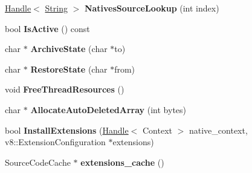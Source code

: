 \begin{DoxyCompactItemize}
\item 
\hypertarget{classv8_1_1internal_1_1_v8___f_i_n_a_l_a0fd236172f555c012da404f3e9b9d08c}{}\hyperlink{classv8_1_1internal_1_1_handle}{Handle}$<$ \hyperlink{classv8_1_1internal_1_1_string}{String} $>$ {\bfseries Natives\+Source\+Lookup} (int index)\label{classv8_1_1internal_1_1_v8___f_i_n_a_l_a0fd236172f555c012da404f3e9b9d08c}

\item 
\hypertarget{classv8_1_1internal_1_1_v8___f_i_n_a_l_ac5ed5ad1cb0bec51ad0bfde476f3fd45}{}bool {\bfseries Is\+Active} () const \label{classv8_1_1internal_1_1_v8___f_i_n_a_l_ac5ed5ad1cb0bec51ad0bfde476f3fd45}

\item 
\hypertarget{classv8_1_1internal_1_1_v8___f_i_n_a_l_a6c203854043db3ee9b23f61fe0b7ed3d}{}char $\ast$ {\bfseries Archive\+State} (char $\ast$to)\label{classv8_1_1internal_1_1_v8___f_i_n_a_l_a6c203854043db3ee9b23f61fe0b7ed3d}

\item 
\hypertarget{classv8_1_1internal_1_1_v8___f_i_n_a_l_a42ad7171ba6593cc182608ba6111fd7b}{}char $\ast$ {\bfseries Restore\+State} (char $\ast$from)\label{classv8_1_1internal_1_1_v8___f_i_n_a_l_a42ad7171ba6593cc182608ba6111fd7b}

\item 
\hypertarget{classv8_1_1internal_1_1_v8___f_i_n_a_l_aca549edfb8424152d2cf58ae9d79afbc}{}void {\bfseries Free\+Thread\+Resources} ()\label{classv8_1_1internal_1_1_v8___f_i_n_a_l_aca549edfb8424152d2cf58ae9d79afbc}

\item 
\hypertarget{classv8_1_1internal_1_1_v8___f_i_n_a_l_abfabd4a2a1e6b490c926c47ded89544d}{}char $\ast$ {\bfseries Allocate\+Auto\+Deleted\+Array} (int bytes)\label{classv8_1_1internal_1_1_v8___f_i_n_a_l_abfabd4a2a1e6b490c926c47ded89544d}

\item 
\hypertarget{classv8_1_1internal_1_1_v8___f_i_n_a_l_aa0a2d150c312ff75e9402b20e51ce499}{}bool {\bfseries Install\+Extensions} (\hyperlink{classv8_1_1internal_1_1_handle}{Handle}$<$ Context $>$ native\+\_\+context, v8\+::\+Extension\+Configuration $\ast$extensions)\label{classv8_1_1internal_1_1_v8___f_i_n_a_l_aa0a2d150c312ff75e9402b20e51ce499}

\item 
\hypertarget{classv8_1_1internal_1_1_v8___f_i_n_a_l_a68c7916d7f6cb19e5c8a3a8e77bb8002}{}Source\+Code\+Cache $\ast$ {\bfseries extensions\+\_\+cache} ()\label{classv8_1_1internal_1_1_v8___f_i_n_a_l_a68c7916d7f6cb19e5c8a3a8e77bb8002}


\end{DoxyCompactItemize}
